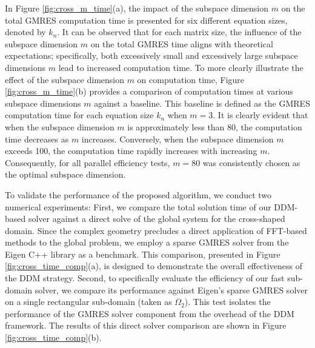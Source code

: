 \documentclass[preprint]{elsarticle}
\begin{document}
In Figure \ref{fig:cross_m_time}(a), the impact of the subspace dimension $m$ on the total GMRES computation time is presented for six different equation sizes, denoted by $k_n$. It can be observed that for each matrix size, the influence of the subspace dimension $m$ on the total GMRES time aligns with theoretical expectations; specifically, both excessively small and excessively large subspace dimensions $m$ lead to increased computation time. To more clearly illustrate the effect of the subspace dimension $m$ on computation time, Figure \ref{fig:cross_m_time}(b) provides a comparison of computation times at various subspace dimensions $m$ against a baseline. This baseline is defined as the GMRES computation time for each equation size $k_n$ when $m=3$. It is clearly evident that when the subspace dimension $m$ is approximately less than 80, the computation time decreases as $m$ increases. Conversely, when the subspace dimension $m$ exceeds 100, the computation time rapidly increases with increasing $m$. Consequently, for all parallel efficiency tests, $m=80$ was consistently chosen as the optimal subspace dimension.\par


To validate the performance of the proposed algorithm, we conduct two numerical experiments: First, we compare the total solution time of our DDM-based solver against a direct solve of the global system for the cross-shaped domain. Since the complex geometry precludes a direct application of FFT-based methods to the global problem, we employ a sparse GMRES solver from the Eigen C++ library \cite{eigenweb} as a benchmark. This comparison, presented in Figure \ref{fig:cross_time_comp}(a), is designed to demonstrate the overall effectiveness of the DDM strategy. Second, to specifically evaluate the efficiency of our fast sub-domain solver, we compare its performance against Eigen's sparse GMRES solver on a single rectangular sub-domain (taken as $\Omega_2$). This test isolates the performance of the GMRES solver component from the overhead of the DDM framework. The results of this direct solver comparison are shown in Figure \ref{fig:cross_time_comp}(b).
\end{document}
